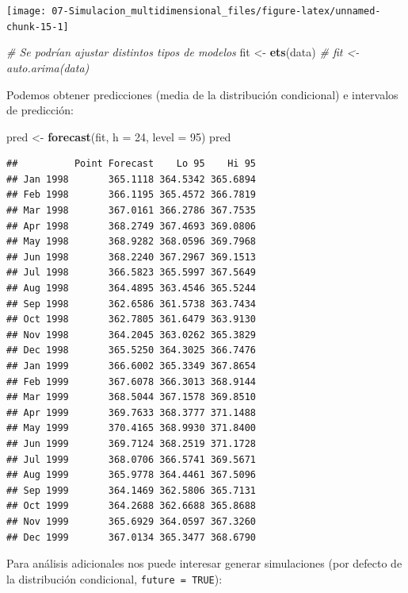 \documentclass[
]{book}
\newenvironment{Shaded}{\begin{snugshade}}{\end{snugshade}}
\newcommand{\CommentTok}[1]{\textcolor[rgb]{0.56,0.35,0.01}{\textit{#1}}}
\newcommand{\DataTypeTok}[1]{\textcolor[rgb]{0.13,0.29,0.53}{#1}}
\newcommand{\DecValTok}[1]{\textcolor[rgb]{0.00,0.00,0.81}{#1}}
\newcommand{\KeywordTok}[1]{\textcolor[rgb]{0.13,0.29,0.53}{\textbf{#1}}}
\newcommand{\NormalTok}[1]{#1}
\newcommand{\StringTok}[1]{\textcolor[rgb]{0.31,0.60,0.02}{#1}}
\theoremstyle{break}
\theoremstyle{definition}
\theoremstyle{definition}
\theoremstyle{definition}
\theoremstyle{remark}
\begin{document}
\begin{center}\texttt{[image: 07-Simulacion\_multidimensional\_files/figure-latex/unnamed-chunk-15-1]} \end{center}

\begin{Shaded}
\begin{Highlighting}[]
\CommentTok{# Se podrían ajustar distintos tipos de modelos}
\NormalTok{fit <-}\StringTok{ }\KeywordTok{ets}\NormalTok{(data)}
\CommentTok{# fit <- auto.arima(data)}
\end{Highlighting}
\end{Shaded}

Podemos obtener predicciones (media de la distribución condicional) e intervalos de predicción:

\begin{Shaded}
\begin{Highlighting}[]
\NormalTok{pred <-}\StringTok{ }\KeywordTok{forecast}\NormalTok{(fit, }\DataTypeTok{h =} \DecValTok{24}\NormalTok{, }\DataTypeTok{level =} \DecValTok{95}\NormalTok{)}
\NormalTok{pred}
\end{Highlighting}
\end{Shaded}

\begin{verbatim}
##          Point Forecast    Lo 95    Hi 95
## Jan 1998       365.1118 364.5342 365.6894
## Feb 1998       366.1195 365.4572 366.7819
## Mar 1998       367.0161 366.2786 367.7535
## Apr 1998       368.2749 367.4693 369.0806
## May 1998       368.9282 368.0596 369.7968
## Jun 1998       368.2240 367.2967 369.1513
## Jul 1998       366.5823 365.5997 367.5649
## Aug 1998       364.4895 363.4546 365.5244
## Sep 1998       362.6586 361.5738 363.7434
## Oct 1998       362.7805 361.6479 363.9130
## Nov 1998       364.2045 363.0262 365.3829
## Dec 1998       365.5250 364.3025 366.7476
## Jan 1999       366.6002 365.3349 367.8654
## Feb 1999       367.6078 366.3013 368.9144
## Mar 1999       368.5044 367.1578 369.8510
## Apr 1999       369.7633 368.3777 371.1488
## May 1999       370.4165 368.9930 371.8400
## Jun 1999       369.7124 368.2519 371.1728
## Jul 1999       368.0706 366.5741 369.5671
## Aug 1999       365.9778 364.4461 367.5096
## Sep 1999       364.1469 362.5806 365.7131
## Oct 1999       364.2688 362.6688 365.8688
## Nov 1999       365.6929 364.0597 367.3260
## Dec 1999       367.0134 365.3477 368.6790
\end{verbatim}

Para análisis adicionales nos puede interesar generar simulaciones (por defecto de la distribución condicional, \texttt{future\ =\ TRUE}):
\end{document}
